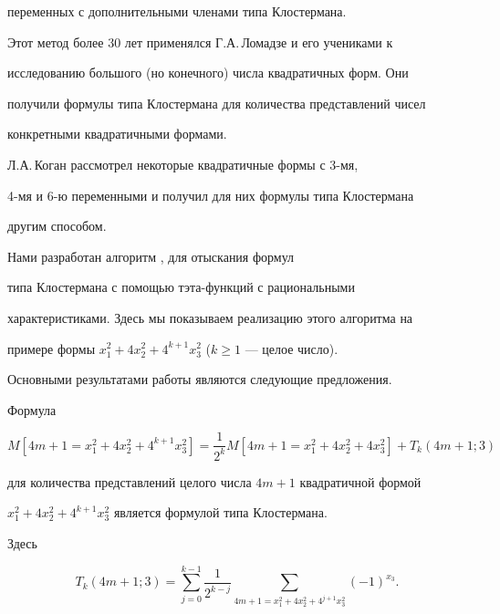 переменных с дополнительными членами типа Клостермана.





Этот метод более 30 лет применялся Г.А.\,Ломадзе и его учениками к


исследованию большого (но конечного) числа квадратичных форм. Они


получили формулы типа Клостермана для количества представлений чисел


конкретными квадратичными формами.





Л.А.\,Коган \cite{K10} рассмотрел некоторые квадратичные формы с 3-мя,


4-мя и 6-ю переменными и получил для них формулы типа Клостермана


другим способом.





Нами разработан алгоритм \cite{T12}, \cite{T15} для отыскания формул


типа Клостермана с помощью тэта-функций с рациональными


характеристиками. Здесь мы показываем реализацию этого алгоритма на


примере формы $x^2_1+4x^2_2+4^{k+1}x^2_3$ ($k\ge 1$ --- целое число).





Основными результатами работы являются следующие предложения.





\begin{thm}


Формула


\begin{equation}


M[4m+1=x^2_1+4x^2_2+4^{k+1}x^2_3]=


\frac{1}{2^k}M[4m+1=x^2_1+4x^2_2+4x^2_3]+T_k(4m+1;3)


\end{equation}


для количества представлений целого числа $4m+1$ квадратичной формой


$x^2_1+4x^2_2+4^{k+1}x^2_3$ является формулой типа Клостермана.





Здесь


\begin{equation}


T_k(4m+1;3)=\sum^{k-1}_{j=0}\frac{1}{2^{k-j}}


\sum_{4m+1=x^2_1+4x^2_2+4^{j+1}x^2_3}(-1)^{x_3}.


\end{equation}


\end{thm}





